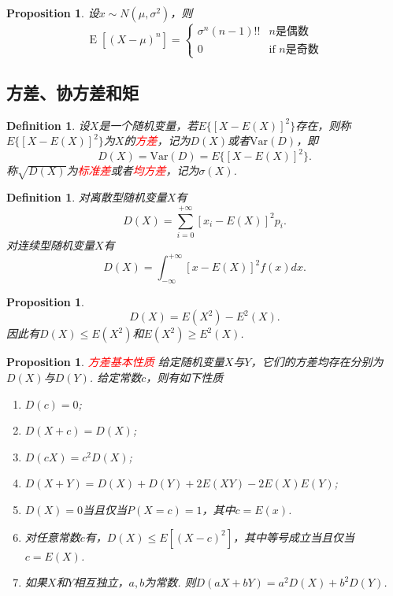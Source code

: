 \documentclass{article}
\newtheorem{proposition}[theorem]{Proposition}
\newtheorem{definition}[theorem]{Definition}
\newcommand{\redt}[1]{\textcolor{red}{#1}}
\begin{document}
\begin{proposition}
\rm 设$x \sim N(\mu,\sigma^2)$，则
$$
\operatorname {E} \left[(X-\mu )^{n}\right]={\begin{cases} \sigma ^{n}(n-1)!!&n\text{是偶数} \\ 0 & {\text{if }} n\text{是奇数} \end{cases}}
$$
\end{proposition}


\newpage
\subsection{方差、协方差和矩}

\begin{definition}
\rm 设$X$是一个随机变量，若$E\{\left[X-E(X)\right]^2\}$存在，则称$E\{\left[X-E(X)\right]^2\}$为$X$的\redt{方差}，记为$D(X)$或者$\text{Var}(D)$，即
$$
D(X) = \text{Var}(D) = E\{\left[X-E(X)\right]^2\}.
$$
称$\sqrt{D(X)}$为\redt{标准差}或者\redt{均方差}，记为$\sigma(X)$. 
\end{definition}

\begin{definition}
\rm  对离散型随机变量$X$有
$$
D(X) = \sum\limits_{i = 0}^{+\infty} \left[ x_i - E(X) \right]^2 p_i.
$$
对连续型随机变量$X$有
$$
D(X) = \int_{-\infty}^{+\infty}\left[x-E(X)\right]^2f(x)dx.
$$
\end{definition}

\begin{proposition}
\rm 
$$
D(X)= E(X^2) - E^2(X). 
$$
因此有$D(X) \leq E(X^2)$和$E(X^2) \geq E^2(X)$.
\end{proposition}


\begin{proposition}
\rm \redt{方差基本性质} 给定随机变量$X$与$Y$，它们的方差均存在分别为$D(X)$与$D(Y)$. 给定常数$c$，则有如下性质
\begin{enumerate}
	\item $D(c) = 0$;
	\item $D(X+c) = D(X)$;
	\item $D(cX) = c^2D(X)$;
	\item $D(X+Y) = D(X)+D(Y)+2E(XY)-2E(X)E(Y)$;
	\item $D(X) = 0$当且仅当$P(X=c) = 1$，其中$c=E(x)$.
	\item 对任意常数$c$有，$D(X) \leq E[(X-c)^2]$，其中等号成立当且仅当$c = E(X)$.
	\item 如果$X$和$Y$相互独立，$a,b$为常数. 则$D(aX+bY)=a^2D(X)+b^2D(Y)$.
\end{enumerate}
\end{proposition}
\end{document}
